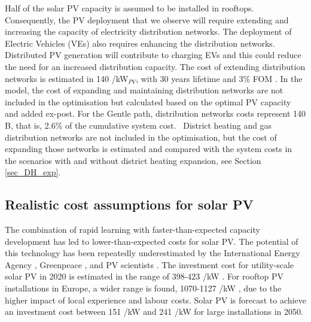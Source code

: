 \documentclass[3p]{elsarticle} %
\begin{document}
Half of the solar PV capacity is assumed to be installed in rooftops. Consequently, the PV deployment that we observe will require extending and increasing the capacity of electricity distribution networks. The deployment of Electric Vehicles (VEs) also requires enhancing the distribution networks. Distributed PV generation will contribute to charging EVs and this could reduce the need for an increased distribution capacity. The cost of extending distribution networks is estimated in 140 \EUR/kW$_{PV}$, with 30 years lifetime and 3\% FOM \cite{Sterchele_2020, DEA_2019}. In the model, the cost of expanding and maintaining distribution networks are not included in the optimisation but calculated based on the optimal PV capacity and added ex-post. For the Gentle path, distribution networks costs represent 140 B\EUR, that is, 2.6\% of the cumulative system cost.  \
District heating and gas distribution networks are not included in the optimisation, but the cost of expanding those networks is estimated and compared with the system costs in the scenarios with and without district heating expansion, see Section \ref{sec_DH_exp}. 

\subsection{Realistic cost assumptions for solar PV} 

The combination of rapid learning with faster-than-expected capacity development has led to lower-than-expected costs for solar PV. The potential of this technology has been repeatedly underestimated by the International Energy Agency \cite{Fell_2015}, Greenpeace \cite{Creutzig_2017}, and PV scientists \cite{Haegel_2019}. The investment cost for utility-scale solar PV in 2020 is estimated in the range of 398-423 \EUR/kW \cite{Vartiainen_2017, DEA_2019}. For rooftop PV installations in Europe, a wider range is found, 1070-1127 \EUR/kW \cite{DEA_2019, Fraunhofer, Vartiainen_2017}, due to the higher impact of local experience and labour costs. Solar PV is forecast to achieve an investment cost between 151 \EUR/kW \cite{Vartiainen_2019} and 241 \EUR/kW  \cite{DEA_2019} for large installations in 2050. \\
\end{document}
